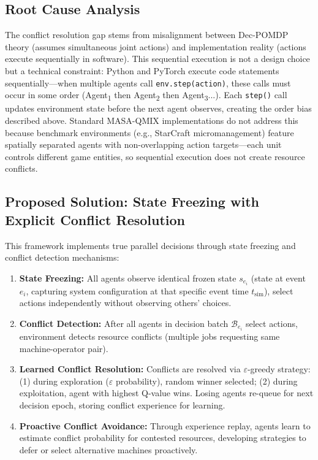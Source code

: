 \subsection{Root Cause Analysis}

The conflict resolution gap stems from misalignment between Dec-POMDP theory (assumes simultaneous joint actions) and implementation reality (actions execute sequentially in software). This sequential execution is not a design choice but a technical constraint: Python and PyTorch execute code statements sequentially—when multiple agents call \texttt{env.step(action)}, these calls must occur in some order (Agent\textsubscript{1} then Agent\textsubscript{2} then Agent\textsubscript{3}...). Each \texttt{step()} call updates environment state before the next agent observes, creating the order bias described above. Standard MASA-QMIX implementations do not address this because benchmark environments (e.g., StarCraft micromanagement) feature spatially separated agents with non-overlapping action targets—each unit controls different game entities, so sequential execution does not create resource conflicts.

\subsection{Proposed Solution: State Freezing with Explicit Conflict Resolution}

This framework implements true parallel decisions through state freezing and conflict detection mechanisms:

\begin{enumerate}
\item \textbf{State Freezing:} All agents observe identical frozen state \( s_{e_i} \) (state at event \( e_i \), capturing system configuration at that specific event time \( t_{\text{sim}} \)), select actions independently without observing others' choices.

\item \textbf{Conflict Detection:} After all agents in decision batch \( \mathcal{B}_{e_i} \) select actions, environment detects resource conflicts (multiple jobs requesting same machine-operator pair).

\item \textbf{Learned Conflict Resolution:} Conflicts are resolved via \( \varepsilon \)-greedy strategy: (1) during exploration (\( \varepsilon \) probability), random winner selected; (2) during exploitation, agent with highest Q-value wins. Losing agents re-queue for next decision epoch, storing conflict experience for learning.

\item \textbf{Proactive Conflict Avoidance:} Through experience replay, agents learn to estimate conflict probability for contested resources, developing strategies to defer or select alternative machines proactively.
\end{enumerate}

